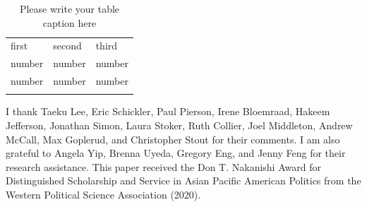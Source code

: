 %
\begin{table}
\caption{Please write your table caption here}
\label{tab:1}       %
\begin{tabular}{lll}
\hline\noalign{\smallskip}
first & second & third  \\
\noalign{\smallskip}\hline\noalign{\smallskip}
number & number & number \\
number & number & number \\
\noalign{\smallskip}\hline
\end{tabular}
\end{table}


\begin{acknowledgements}
I thank Taeku Lee, Eric Schickler, Paul Pierson, Irene Bloemraad, Hakeem Jefferson, Jonathan Simon, Laura Stoker, Ruth Collier, Joel Middleton, Andrew McCall, Max Goplerud, and Christopher Stout for their comments. I am also grateful to Angela Yip, Brenna Uyeda, Gregory Eng, and Jenny Feng for their research assistance. This paper received the Don T. Nakanishi Award for Distinguished Scholarship and Service in Asian Pacific American Politics from the Western Political Science Association (2020).
\end{acknowledgements}


%
%



%
%


